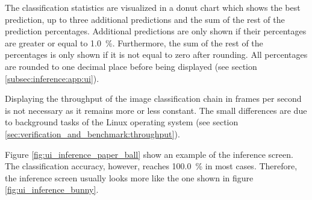 The classification statistics are visualized in a donut chart which shows the best prediction, up to three additional predictions and the sum of the rest of the prediction percentages.
Additional predictions are only shown if their percentages are greater or equal to \SI{1.0}{\percent}.
Furthermore, the sum of the rest of the percentages is only shown if it is not equal to zero after rounding.
All percentages are rounded to one decimal place before being displayed (see section \ref{subsec:inference:app:ui}).

Displaying the throughput of the image classification chain in frames per second is not necessary as it remains more or less constant.
The small differences are due to background tasks of the Linux operating system (see section \ref{sec:verification_and_benchmark:throughput}).

Figure \ref{fig:ui_inference_paper_ball} show an example of the inference screen.
The classification accuracy, however, reaches \SI{100.0}{\percent} in most cases.
Therefore, the inference screen usually looks more like the one shown in figure \ref{fig:ui_inference_bunny}.

